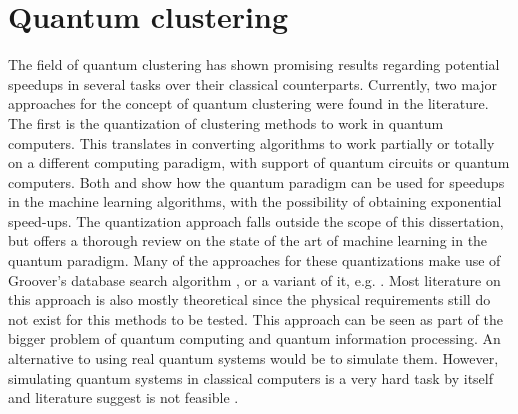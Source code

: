 %
%

\section{Quantum clustering}
\label{sec:quantum clustering}


The field of quantum clustering has shown promising results regarding potential speedups in several tasks over their classical counterparts. 
Currently, two major approaches for the concept of quantum clustering were found in the literature.
The first is the quantization of clustering methods to work in quantum computers.
This translates in converting algorithms to work partially or totally on a different computing paradigm, with support of quantum circuits or quantum computers.
Both \cite{Aimeur2013} and \cite{Lloyd2013} show how the quantum paradigm can be used for speedups in the machine learning algorithms, with the possibility of obtaining exponential speed-ups.
The quantization approach falls outside the scope of this dissertation, but \cite{wittek2014quantum} offers a thorough review on the state of the art of machine learning in the quantum paradigm.
Many of the approaches for these quantizations make use of Groover's database search algorithm \cite{grover1996fast}, or a variant of it, e.g. \cite{Wiebe2014}.
Most literature on this approach is also mostly theoretical since the physical requirements still do not exist for this methods to be tested.
This approach can be seen as part of the bigger problem of quantum computing and quantum information processing.
An alternative to using real quantum systems would be to simulate them.
However, simulating quantum systems in classical computers is a very hard task by itself and literature suggest is not feasible \cite{Feynman1982}.

